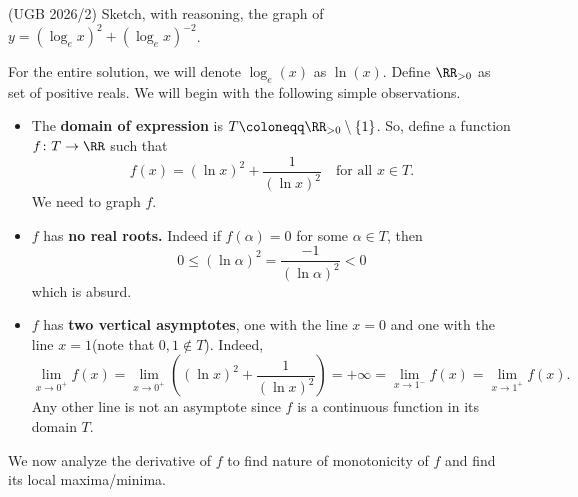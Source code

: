\documentclass[numbers=endperiod, 11pt]{scrartcl}
\begin{document}
\begin{prob}{(UGB 2026/2)}{}
    Sketch, with reasoning, the graph of
    $y = (\log_e x)^2 + (\log_e x)^{-2}$.
\end{prob}
\begin{sol}
    For the entire solution, we will denote $\log_e(x)$ as
    $\ln(x)$. Define $\RR_{>0}$ as set of positive reals.
    We will begin with the following simple observations.
    \begin{itemize}
        \item The \textbf{domain of expression} is
              $T \coloneqq \RR_{> 0} \setminus \{1\}$. So,
              define a function $f\colon T \to \RR$ such
              that
              \[ f(x) = (\ln x)^2 + \frac{1}{(\ln x)^2} \quad \text{for all }x \in T.\]
              We need to graph $f$.
        \item $f$ has \textbf{no real roots.} Indeed if
              $f(\alpha) = 0$ for some $\alpha \in T$, then
              \[ 0 \le (\ln \alpha)^2 = \frac{-1}{(\ln \alpha)^2} < 0 \]
              which is absurd.
        \item $f$ has \textbf{two vertical asymptotes},
              one with the line $x = 0$ and one with the line
              $x = 1$(note that $0,1 \not\in T$). Indeed,
              \[ \lim_{x \to 0^+} f(x) = \lim_{x \to 0^+} \left((\ln x)^2 + \frac{1}{(\ln x)^2}\right) = +\infty = \lim_{x \to 1^-} f(x) = \lim_{x \to 1^+} f(x).\]
              Any other line is not an asymptote since
              $f$ is a continuous function in its domain $T$.
    \end{itemize}

    We now analyze the derivative of $f$ to find
    nature of monotonicity of $f$ and find its local
    maxima/minima.


\end{sol}
\end{document}
